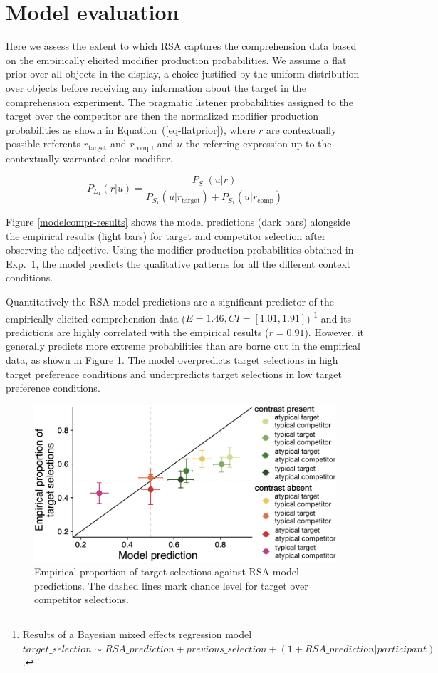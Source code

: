 \documentclass[10pt,letterpaper]{article}
\newcommand{\figref}[1]{Figure \ref{#1}}
\begin{document}
\section{Model evaluation}

Here we assess the extent to which RSA captures the comprehension data based on the empirically elicited modifier production probabilities. We assume a flat prior over all objects in the display, a choice justified by the uniform distribution over objects before receiving any information about the target in the comprehension experiment. The pragmatic listener probabilities assigned to the target over the competitor are then the normalized modifier production probabilities as shown in Equation~(\ref{eq-flatprior}), where $r$ are contextually possible referents $r_{\text{target}}$ and $r_{\text{comp}}$, and $u$ the referring expression up to the contextually warranted color modifier.

\begin{equation}
	P_{L_1}(r|u) = \frac{P_{S_1}(u|r)}{P_{S_1}(u|r_{\text{target}}) + P_{S_1}(u|r_{\text{comp}})}
\label{eq-flatprior}
\end{equation}

\figref{modelcompr-results} shows the model predictions (dark bars) alongside the empirical results (light bars) for target and competitor selection after observing the adjective. Using the modifier production probabilities obtained in Exp.~1, the model predicts the qualitative patterns for all the different context conditions. 

Quantitatively the RSA model predictions are a significant predictor of the empirically elicited comprehension data ($E=1.46, CI=[1.01, 1.91]$)
\footnote{Results of a Bayesian mixed effects regression model $target\_selection \sim RSA\_prediction + previous\_selection + (1+RSA\_prediction|participant)$.} 
and its predictions are highly correlated with the empirical results ($r=0.91$). However, it generally predicts more extreme probabilities than are borne out in the empirical data, as shown in \figref{model-results-corr-flatprior}. The model overpredicts target selections in high target preference conditions and underpredicts target selections in low target preference conditions. 

\begin{figure}
	\begin{center}
		\includegraphics[width=.475\textwidth]{graphs/corr-plot.pdf}
	\end{center}
\caption{Empirical proportion of target selections against RSA model predictions. The dashed lines mark chance level for target over competitor selections.} 
\label{model-results-corr-flatprior}
\end{figure}
\end{document}
